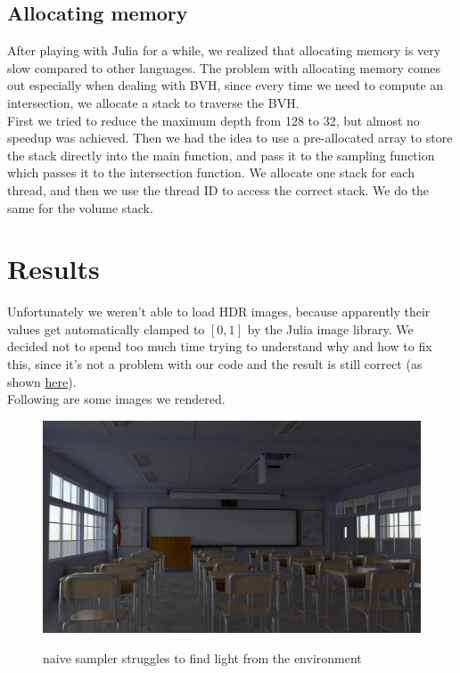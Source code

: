 \documentclass[12pt]{report}
\begin{document}
    \subsection*{Allocating memory}\label{subsec:optimizations-allocating-memory}
    After playing with Julia for a while, we realized that allocating memory is very slow compared to other languages.
    The problem with allocating memory comes out especially when dealing with BVH, since every time we need to compute
    an intersection, we allocate a stack to traverse the BVH\@.\\
    First we tried to reduce the maximum depth from 128 to 32, but almost no speedup was achieved.
    Then we had the idea to use a pre-allocated array to store the stack directly into the main function, and pass it to the
    sampling function which passes it to the intersection function.
    We allocate one stack for each thread, and then we use the thread ID to access the correct stack.
    We do the same for the volume stack.



    \section*{Results}\label{sec:results}
    Unfortunately we weren't able to load HDR images, because apparently their values get automatically clamped to
    $[0,1]$ by the Julia image library.
    We decided not to spend too much time trying to understand why and how to fix this, since it's not a problem with
    our code and the result is still correct (as shown \hyperref[fig:livingroom1_path]{here}).\\
    Following are some images we rendered.\\

    \begin{figure}[h]
        \caption{naive sampler struggles to find light from the environment}
        \includegraphics[width=\textwidth]{classroom_naive}
        \centering
        \label{fig:classroom_naive}
    \end{figure}
\end{document}
